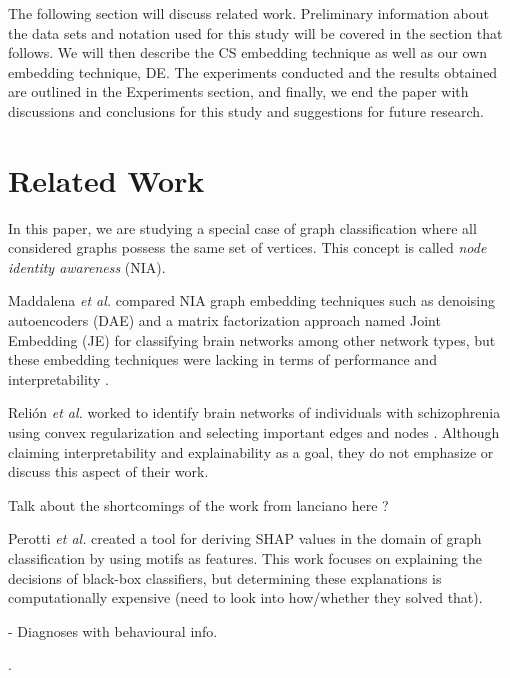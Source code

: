 \documentclass[letterpaper]{article}
\begin{document}
The following section will discuss related work.
Preliminary information about the data sets and notation used for this study will be covered in the section that follows.
We will then describe the CS embedding technique as well as our own embedding technique, DE.
The experiments conducted and the results obtained are outlined in the Experiments section, and finally, we end the paper with discussions and conclusions for this study and suggestions for future research.



\section{Related Work}


In this paper, we are studying a special case of graph classification where all considered graphs possess the same set of vertices.
This concept is called \emph{node identity awareness} (NIA).

Maddalena \emph{et al.} compared NIA graph embedding techniques such as denoising autoencoders (DAE) \cite{gutierrez2019} and a matrix factorization approach named Joint Embedding (JE) \cite{swang2021} for classifying brain networks among other network types, but these embedding techniques were lacking in terms of performance and interpretability \cite{maddalena2021}.

Reli{\'o}n \emph{et al.} worked to identify brain networks of individuals with schizophrenia using convex regularization and selecting important edges and nodes \cite{relion2019}. Although claiming interpretability and explainability as a goal, they do not emphasize or discuss this aspect of their work.

Talk about the shortcomings of the work from lanciano here \cite{lanciano2020}?

Perotti \emph{et al.} created a tool for deriving SHAP values in the domain of graph classification by using motifs as features.
This work focuses on explaining the decisions of black-box classifiers, but determining these explanations is computationally expensive (need to look into how/whether they solved that).

\cite{abbas2020} - Diagnoses with behavioural info.

\cite{thomas2020}
\cite{sewani2020}.

\cite{kong2019}
\cite{perotti2022}
\cite{coupette2022}
\end{document}
